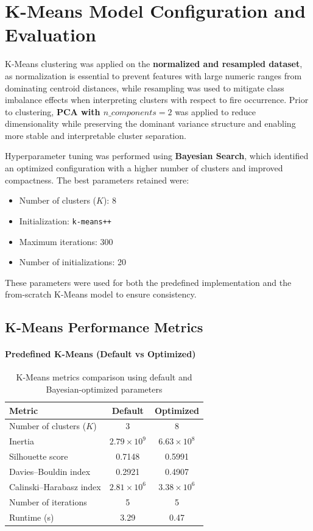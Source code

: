 \section{K-Means Model Configuration and Evaluation}

K-Means clustering was applied on the \textbf{normalized and resampled dataset}, as normalization is essential to prevent features with large numeric ranges from dominating centroid distances, while resampling was used to mitigate class imbalance effects when interpreting clusters with respect to fire occurrence. Prior to clustering, \textbf{PCA with $n\_components = 2$} was applied to reduce dimensionality while preserving the dominant variance structure and enabling more stable and interpretable cluster separation.

Hyperparameter tuning was performed using \textbf{Bayesian Search}, which identified an optimized configuration with a higher number of clusters and improved compactness. The best parameters retained were:
\begin{itemize}
    \item Number of clusters ($K$): 8
    \item Initialization: \texttt{k-means++}
    \item Maximum iterations: 300
    \item Number of initializations: 20
\end{itemize}

These parameters were used for both the predefined implementation and the from-scratch K-Means model to ensure consistency.

\subsection{K-Means Performance Metrics}

\paragraph{Predefined K-Means (Default vs Optimized)}
\begin{table}[H]
\centering
\caption{K-Means metrics comparison using default and Bayesian-optimized parameters}
\begin{tabular}{lcc}
\hline
\textbf{Metric} & \textbf{Default} & \textbf{Optimized} \\
\hline
Number of clusters ($K$) & 3 & 8 \\
Inertia & $2.79 \times 10^{9}$ & $6.63 \times 10^{8}$ \\
Silhouette score & 0.7148 & 0.5991 \\
Davies--Bouldin index & 0.2921 & 0.4907 \\
Calinski--Harabasz index & $2.81 \times 10^{6}$ & $3.38 \times 10^{6}$ \\
Number of iterations & 5 & 5 \\
Runtime (s) & 3.29 & 0.47 \\
\hline
\end{tabular}
\end{table}

